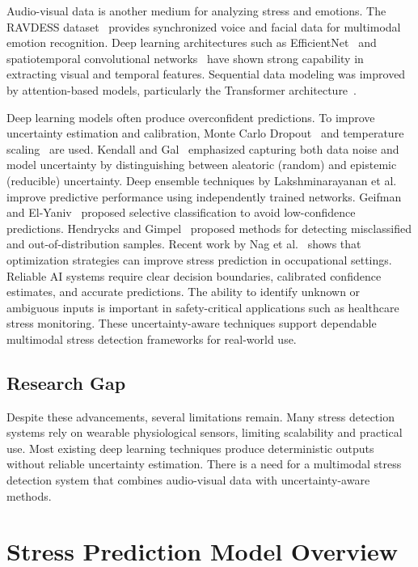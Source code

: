 \documentclass[conference]{IEEEtran}
\begin{document}
Audio-visual data is another medium for analyzing stress and emotions. The RAVDESS dataset~\cite{ref5} provides synchronized voice and facial data for multimodal emotion recognition. Deep learning architectures such as EfficientNet~\cite{ref6} and spatiotemporal convolutional networks~\cite{ref7} have shown strong capability in extracting visual and temporal features. Sequential data modeling was improved by attention-based models, particularly the Transformer architecture~\cite{ref8}.

Deep learning models often produce overconfident predictions. To improve uncertainty estimation and calibration, Monte Carlo Dropout~\cite{ref9} and temperature scaling~\cite{ref10} are used. Kendall and Gal~\cite{ref11} emphasized capturing both data noise and model uncertainty by distinguishing between aleatoric (random) and epistemic (reducible) uncertainty. Deep ensemble techniques by Lakshminarayanan et al.~\cite{ref12} improve predictive performance using independently trained networks. Geifman and El-Yaniv~\cite{ref13} proposed selective classification to avoid low-confidence predictions. Hendrycks and Gimpel~\cite{ref14} proposed methods for detecting misclassified and out-of-distribution samples. Recent work by Nag et al.~\cite{ref15} shows that optimization strategies can improve stress prediction in occupational settings. Reliable AI systems require clear decision boundaries, calibrated confidence estimates, and accurate predictions. The ability to identify unknown or ambiguous inputs is important in safety-critical applications such as healthcare stress monitoring. These uncertainty-aware techniques support dependable multimodal stress detection frameworks for real-world use.

\subsection{Research Gap}

Despite these advancements, several limitations remain. Many stress detection systems rely on wearable physiological sensors, limiting scalability and practical use. Most existing deep learning techniques produce deterministic outputs without reliable uncertainty estimation. There is a need for a multimodal stress detection system that combines audio-visual data with uncertainty-aware methods.
\section{Stress Prediction Model Overview}
\end{document}
